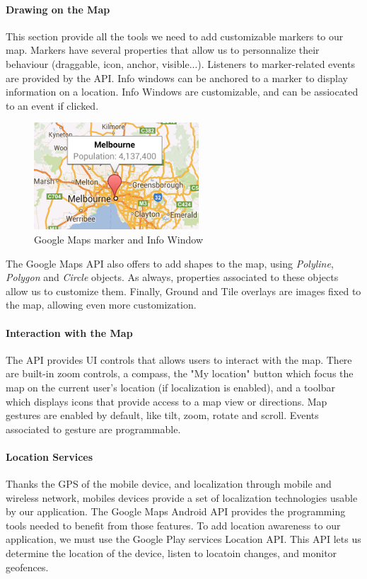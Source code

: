 \paragraph{Drawing on the Map} This section provide all the tools we need to add customizable markers to our map. Markers have several properties that allow us to personnalize their behaviour (draggable, icon, anchor, visible...). Listeners to marker-related events are provided by the API. Info windows can be anchored to a marker to display information on a location. Info Windows are customizable, and can be assiocated to an event if clicked.
\begin{figure}[h!]
	\centering
	\includegraphics[scale=0.8]{input/marker-infowindows.png}
	\caption{Google Maps marker and Info Window}
	\label{fig:marker}
\end{figure}
\newpage
The Google Maps API also offers to add shapes to the map, using \textit{Polyline}, \textit{Polygon} and \textit{Circle} objects. As always, properties associated to these objects allow us to customize them. Finally, Ground and Tile overlays are images fixed to the map, allowing even more customization.

\paragraph{Interaction with the Map} The API provides UI controls that allows users to interact with the map. There are built-in zoom controls, a compass, the "My location" button which focus the map on the current user's location (if localization is enabled), and a toolbar which displays icons that provide access to a map view or directions. Map gestures are enabled by default, like tilt, zoom, rotate and scroll. Events associated to gesture are programmable.

\paragraph{Location Services} Thanks the GPS of the mobile device, and localization through mobile and wireless network, mobiles devices provide a set of localization technologies usable by our application. The Google Maps Android API provides the programming tools needed to benefit from those features. To add location awareness to our application, we must use the Google Play services Location API. This API lets us determine the location of the device, listen to locatoin changes, and monitor geofences.

